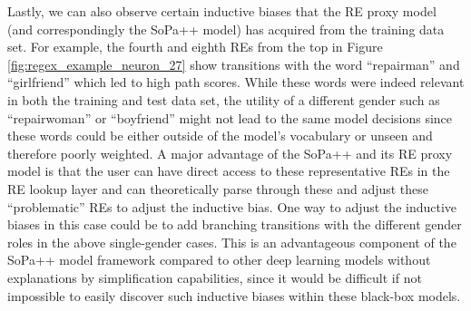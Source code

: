 Lastly, we can also observe certain inductive biases that the RE proxy model
(and correspondingly the SoPa++ model) has acquired from the training data set.
For example, the fourth and eighth REs from the top in Figure
\ref{fig:regex_example_neuron_27} show transitions with the word ``repairman''
and ``girlfriend'' which led to high path scores. While these words were indeed
relevant in both the training and test data set, the utility of a different
gender such as ``repairwoman'' or ``boyfriend'' might not lead to the same model
decisions since these words could be either outside of the model's vocabulary or
unseen and therefore poorly weighted. A major advantage of the SoPa++ and its RE
proxy model is that the user can have direct access to these representative REs
in the RE lookup layer and can theoretically parse through these and adjust
these ``problematic'' REs to adjust the inductive bias. One way to adjust the
inductive biases in this case could be to add branching transitions with the
different gender roles in the above single-gender cases. This is an advantageous
component of the SoPa++ model framework compared to other deep learning models
without explanations by simplification capabilities, since it would be difficult
if not impossible to easily discover such inductive biases within these
black-box models. 

